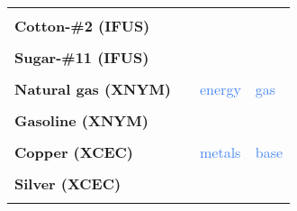 \documentclass[
  authoryear,
  preprint,
  3p]{elsarticle}
\begin{document}
\begin{longtable}[t]{>{}l>{}l>{}l>{}l}
\addlinespace
\textbf{\cellcolor{gray!10}{Coffee-C (IFUS)}} & \textcolor[HTML]{4285f4}{\cellcolor{gray!10}{}} & \textcolor[HTML]{4285f4}{\cellcolor{gray!10}{}} & \textcolor[HTML]{4285f4}{\cellcolor{gray!10}{}}\\
\textbf{Cotton-\#2 (IFUS)} & \textcolor[HTML]{4285f4}{} & \textcolor[HTML]{4285f4}{} & \textcolor[HTML]{4285f4}{}\\
\textbf{\cellcolor{gray!10}{Orange juice (IFUS)}} & \textcolor[HTML]{4285f4}{\cellcolor{gray!10}{}} & \textcolor[HTML]{4285f4}{\cellcolor{gray!10}{}} & \textcolor[HTML]{4285f4}{\cellcolor{gray!10}{}}\\
\textbf{Sugar-\#11 (IFUS)} & \textcolor[HTML]{4285f4}{} & \textcolor[HTML]{4285f4}{} & \textcolor[HTML]{4285f4}{}\\
\textbf{\cellcolor{gray!10}{Lumber (XCME)}} & \textcolor[HTML]{4285f4}{\cellcolor{gray!10}{}} & \textcolor[HTML]{4285f4}{\cellcolor{gray!10}{}} & \textcolor[HTML]{4285f4}{\cellcolor{gray!10}{}}\\
\addlinespace
\textbf{Natural gas (XNYM)} & \textcolor[HTML]{4285f4}{} & \textcolor[HTML]{4285f4}{energy} & \textcolor[HTML]{4285f4}{gas}\\
\textbf{\cellcolor{gray!10}{Crude oil-WTI (XNYM)}} & \textcolor[HTML]{4285f4}{\cellcolor{gray!10}{}} & \textcolor[HTML]{4285f4}{\cellcolor{gray!10}{}} & \textcolor[HTML]{4285f4}{\cellcolor{gray!10}{petroleum}}\\
\textbf{Gasoline (XNYM)} & \textcolor[HTML]{4285f4}{} & \textcolor[HTML]{4285f4}{} & \textcolor[HTML]{4285f4}{}\\
\textbf{\cellcolor{gray!10}{Heating oil (XNYM)}} & \textcolor[HTML]{4285f4}{\cellcolor{gray!10}{}} & \textcolor[HTML]{4285f4}{\cellcolor{gray!10}{}} & \textcolor[HTML]{4285f4}{\cellcolor{gray!10}{}}\\
\textbf{Copper (XCEC)} & \textcolor[HTML]{4285f4}{} & \textcolor[HTML]{4285f4}{metals} & \textcolor[HTML]{4285f4}{base}\\
\addlinespace
\textbf{\cellcolor{gray!10}{Gold (XCEC)}} & \textcolor[HTML]{4285f4}{\cellcolor{gray!10}{}} & \textcolor[HTML]{4285f4}{\cellcolor{gray!10}{}} & \textcolor[HTML]{4285f4}{\cellcolor{gray!10}{precious}}\\
\textbf{Silver (XCEC)} & \textcolor[HTML]{4285f4}{} & \textcolor[HTML]{4285f4}{} & \textcolor[HTML]{4285f4}{}\\
\textbf{\cellcolor{gray!10}{Palladium (XNYM)}} & \textcolor[HTML]{4285f4}{\cellcolor{gray!10}{}} & \textcolor[HTML]{4285f4}{\cellcolor{gray!10}{}} & \textcolor[HTML]{4285f4}{\cellcolor{gray!10}{}}\\

\end{longtable}
\end{document}
